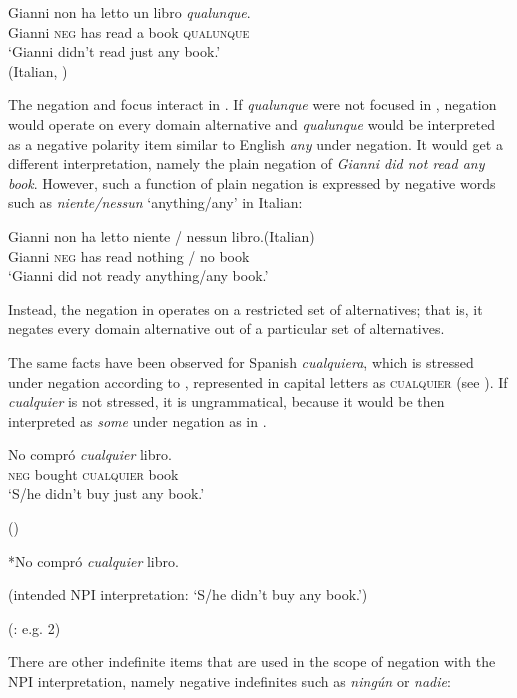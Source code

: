 \ea \label{bkm:Ref42805226}  %
\gll Gianni non ha letto un libro \textit{qualunque}.\\
  Gianni \textsc{neg} has read a book \textsc{qualunque}\\ 
  \glt ‘Gianni didn’t read just any book.’\\
  (Italian, \cite[95]{Falaus2013})
\z

The negation and focus interact in . If \textit{qualunque} were not focused in , negation would operate on {every} domain alternative and \textit{qualunque} would be interpreted as a negative polarity item similar to English \textit{any} under negation. It would get a different interpretation, namely the plain negation of \textit{Gianni did not read any book}. However, such a function of plain negation is expressed by negative words such as \textit{niente/nessun} ‘anything/any’ in Italian:

\ea \label{ex:key:111} %
  \gll Gianni non ha letto niente / nessun libro.\hfill (Italian)\\
Gianni \textsc{neg} has read nothing / no book\\
  \glt ‘Gianni did not ready anything/any book.’
\z

Instead, the negation in  operates on a {restricted} set of alternatives; that is, it negates every domain alternative out of a particular set of alternatives.

The same facts have been observed for Spanish \textit{cualquiera}, which is stressed under negation according to \citet{Arregui2006}, represented in capital letters as \textsc{cualquier} (see \citealt{Arregui2006}). If \textit{cualquier} is not stressed, it is ungrammatical, because it would be then interpreted as \textit{some} under negation as in .

\ea \label{ex:kex:112} %
  \gll No compró \textit{cualquier} libro.\\
\textsc{neg} bought \textsc{cualquier} book\\
  \glt ‘S/he didn't buy just any book.’

  (\citealt{Arregui2006})
\z


\ea  \label{bkm:Ref533953565} %
  *No compró \textit{cualquier} libro.

  (intended NPI interpretation: ‘S/he didn’t buy any book.’)

  (\citealt{Arregui2006}: e.g. 2)
\z

There are other indefinite items that are used in the scope of negation with the NPI interpretation, namely negative indefinites such as \textit{ningún} or \textit{nadie}:


